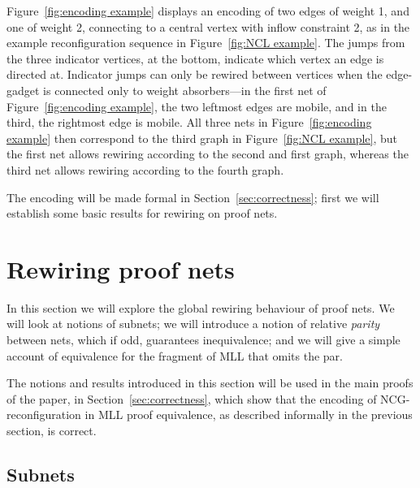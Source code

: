 \documentclass{lmcs}
\let\capsabbrev=\uppercase
\begin{document}
Figure~\ref{fig:encoding example} displays an encoding of two edges of weight 1, and one of weight 2, connecting to a central vertex with inflow constraint 2, as in the example reconfiguration sequence in Figure~\ref{fig:NCL example}.
%
The jumps from the three indicator vertices, at the bottom, indicate which vertex an edge is directed at.
%
Indicator jumps can only be rewired between vertices when the edge-gadget is connected only to weight absorbers---in the first net of Figure~\ref{fig:encoding example}, the two leftmost edges are mobile, and in the third, the rightmost edge is mobile.
%
All three nets in Figure~\ref{fig:encoding example} then correspond to the third graph in Figure~\ref{fig:NCL example}, but the first net allows rewiring according to the second and first graph, whereas the third net allows rewiring according to the fourth graph.



The encoding will be made formal in Section~\ref{sec:correctness}; first we will establish some basic results for rewiring on proof nets.






\section{Rewiring proof nets}
\label{sec:rewiring}


%
In this section we will explore the global rewiring behaviour of proof nets.
%
We will look at notions of subnets; we will introduce a notion of relative \emph{parity} between nets, which if odd, guarantees inequivalence; and we will give a simple account of equivalence for the fragment of \capsabbrev{mll} that omits the par.



The notions and results introduced in this section will be used in the main proofs of the paper, in Section~\ref{sec:correctness}, which show that the encoding of \capsabbrev{ncg}-reconfiguration in \capsabbrev{MLL} proof equivalence, as described informally in the previous section, is correct.



\subsection*{Subnets}
\end{document}
